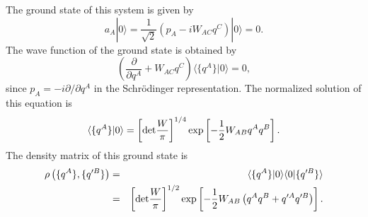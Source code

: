 The ground state of this system is given by
\begin{equation}
a_A|0\rangle=
\frac{1}{\sqrt{2}}\left(p_A-iW_{AC}q^C\right)|0\rangle=0.
\end{equation}
The wave function of the ground state is
obtained by
\begin{equation}
\left(\frac{\partial}{\partial q^A}+W_{AC}q^C\right)
   \langle\{q^A\}|0\rangle=0,
\end{equation}
since $p_A=-i\partial/\partial q^A$ in the
Schr\"odinger representation.
The normalized solution of this equation is
\begin{equation}
\langle\{q^A\}|0\rangle=\left[{\rm det}\frac{W}{\pi}\right]^{1/4}
  \exp\left[-\frac{1}{2}W_{AB}q^Aq^B\right].
\end{equation}
The density matrix of this ground state is
\begin{eqnarray}
 \rho\left(\{q^A\},\{q'^B\}\right)
  &=& \langle\{q^A\}|0\rangle \langle0|\{q'^B\}\rangle\\
  &=& \left[{\rm det}\frac{W}{\pi}\right]^{1/2}
       \exp\left[-\frac{1}{2}W_{AB}
        \left(q^Aq^B+q'^Aq'^B\right)\right].
\end{eqnarray}

